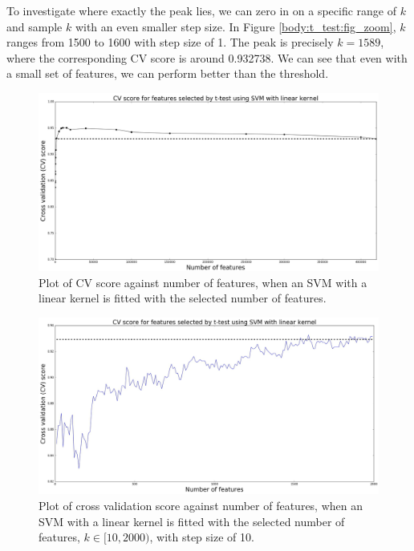 \documentclass[12pt, twoside, a4paper]{report}
\begin{document}
To investigate where exactly the peak lies, we can zero in on a specific range of $k$ and sample $k$ with an even smaller step size. In Figure \ref{body:t_test:fig_zoom}, $k$ ranges from 1500 to 1600 with step size of 1. The peak is precisely $k=1589$, where the corresponding CV score is around 0.932738. We can see that even with a small set of features, we can perform better than the threshold.



\begin{figure}
\centering
\includegraphics[width=\textwidth]{images/t_test_range.jpeg}
\caption{Plot of CV score against number of features, when an SVM with a linear kernel is fitted with the selected number of features.}
\label{body:t_test:fig:range}
\end{figure}

\begin{figure}
\centering
\includegraphics[width=\textwidth]{images/t_test_2000_uneq_var1.jpeg}
\caption{Plot of cross validation score against number of features, when an SVM with a linear kernel is fitted with the selected number of features, $k \in [10, 2000)$, with step size of 10.}
\label{body:t_test:fig}
\end{figure}
\end{document}
